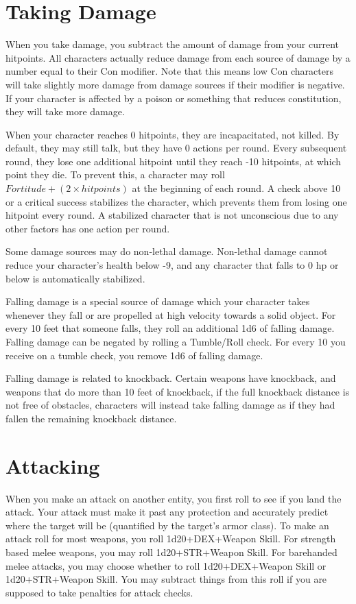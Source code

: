 \section{Taking Damage}
When you take damage, you subtract the amount of damage from your current hitpoints. All characters actually reduce damage from each source of damage by a number equal to their Con modifier. Note that this means low Con characters will take slightly more damage from damage sources if their modifier is negative. If your character is affected by a poison or something that reduces constitution, they will take more damage.

When your character reaches 0 hitpoints, they are incapacitated, not killed. By default, they may still talk, but they have 0 actions per round. Every subsequent round, they lose one additional hitpoint until they reach -10 hitpoints, at which point they die. To prevent this, a character may roll $Fortitude + (2 \times hitpoints)$ at the beginning of each round. A check above 10 or a critical success stabilizes the character, which prevents them from losing one hitpoint every round. A stabilized character that is not unconscious due to any other factors has one action per round.

Some damage sources may do non-lethal damage. Non-lethal damage cannot reduce your character’s health below -9, and any character that falls to 0 hp or below is automatically stabilized.

Falling damage is a special source of damage which your character takes whenever they fall or are propelled at high velocity towards a solid object. For every 10 feet that someone falls, they roll an additional 1d6 of falling damage. Falling damage can be negated by rolling a Tumble/Roll check. For every 10 you receive on a tumble check, you remove 1d6 of falling damage.

Falling damage is related to knockback. Certain weapons have knockback, and weapons that do more than 10 feet of knockback, if the full knockback distance is not free of obstacles, characters will instead take falling damage as if they had fallen the remaining knockback distance.

\section{Attacking}
When you make an attack on another entity, you first roll to see if you land the attack. Your attack must make it past any protection and accurately predict where the target will be (quantified by the target’s armor class).
To make an attack roll for most weapons, you roll 1d20+DEX+Weapon Skill. For strength based melee weapons, you may roll 1d20+STR+Weapon Skill. For barehanded melee attacks, you may choose whether to roll 1d20+DEX+Weapon Skill or 1d20+STR+Weapon Skill. You may subtract things from this roll if you are supposed to take penalties for attack checks.

